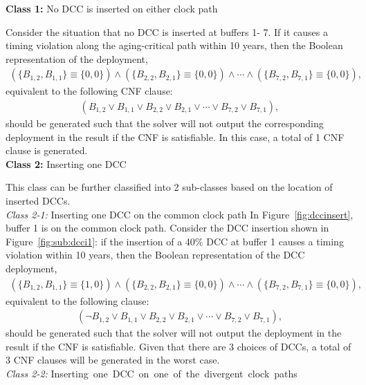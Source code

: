 \noindent \textbf{Class 1:} No DCC is inserted on either clock path

Consider the situation that no DCC is inserted at buffers 1- 7. If it causes a timing violation along the aging-critical path within 10 years, then the Boolean representation of the deployment,
{\fontsize{9}{10}
\begin{gather*}
\left(\{B_{1,2}, B_{1,1}\} \equiv \{0, 0\} \right) \land \left( \{B_{2,2}, B_{2,1}\} \equiv \{0, 0\} \right) \land \dotsb 
\land \left( \{B_{7,2}, B_{7,1}\} \equiv \{0, 0\} \right),
\end{gather*}}
equivalent to the following CNF clause:
{\fontsize{9}{10}
\begin{gather*}
\left(B_{1,2} \lor B_{1,1} \lor B_{2,2} \lor B_{2,1} \lor \dotsb \lor B_{7,2} \lor B_{7,1} \right),
\end{gather*}}
should be generated such that the solver will not output the corresponding deployment in the result if the CNF is satisfiable. In this case, a total of 1 CNF clause is generated.\\

\noindent \textbf{Class 2:} Inserting one DCC

This class can be further classified into 2 sub-classes based on the location of inserted DCCs. \\
\textit{Class 2-1:} Inserting one DCC on the common clock path
In Figure~\ref{fig:dccinsert}, buffer 1 is on the common clock path. Consider the DCC insertion shown in Figure~\ref{fig:sub:dcci1}: if the insertion of a 40\% DCC at buffer 1 causes a timing violation within 10 years, then the Boolean representation of the DCC deployment,
{\fontsize{9}{10}
\begin{gather*}
\left(\{B_{1,2}, B_{1,1}\} \equiv \{1, 0\} \right) \land \left( \{B_{2,2}, B_{2,1}\} \equiv \{0, 0\} \right) \land \dotsb 
\land \left( \{B_{7,2}, B_{7,1}\} \equiv \{0, 0\} \right),
\end{gather*}}equivalent to the following clause:
{\fontsize{9}{10}
\begin{gather*}
\left(\neg B_{1,2} \lor B_{1,1} \lor B_{2,2} \lor B_{2,1} \lor \dotsb \lor B_{7,2} \lor B_{7,1} \right),
\end{gather*}}should be generated such that the solver will not output the deployment in the result if the CNF is satisfiable. Given that there are 3 choices of DCCs, a total of 3 CNF clauses will be generated in the worst case. \\
\textit{Class 2-2:} \mbox{\fontsize{9}{10.8}\selectfont Inserting one DCC on one of the divergent clock paths}

